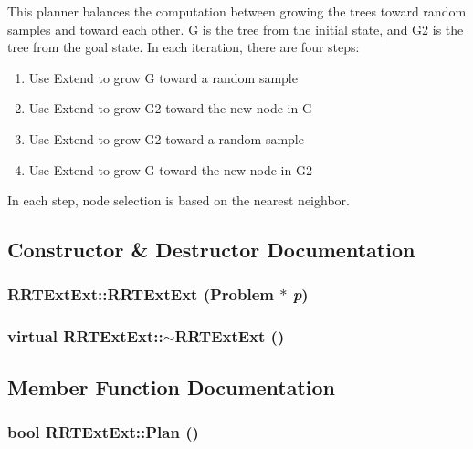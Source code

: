 This planner balances the computation between growing the trees toward random samples and toward each other. G is the tree from the initial state, and G2 is the tree from the goal state. In each iteration, there are four steps: \begin{enumerate}
\item 
Use Extend to grow G toward a random sample \item 
Use Extend to grow G2 toward the new node in G \item 
Use Extend to grow G2 toward a random sample \item 
Use Extend to grow G toward the new node in G2 \end{enumerate}
In each step, node selection is based on the nearest neighbor. 



\subsection{Constructor \& Destructor Documentation}
\subsubsection{\setlength{\rightskip}{0pt plus 5cm}RRTExt\-Ext::RRTExt\-Ext ({\bf Problem} $\ast$ {\em p})}\label{classRRTExtExt_a0}


\subsubsection{\setlength{\rightskip}{0pt plus 5cm}virtual RRTExt\-Ext::$\sim$RRTExt\-Ext ()\hspace{0.3cm}{\tt  [inline, virtual]}}\label{classRRTExtExt_a1}




\subsection{Member Function Documentation}
\subsubsection{\setlength{\rightskip}{0pt plus 5cm}bool RRTExt\-Ext::Plan ()\hspace{0.3cm}{\tt  [virtual]}}\label{classRRTExtExt_a2}



